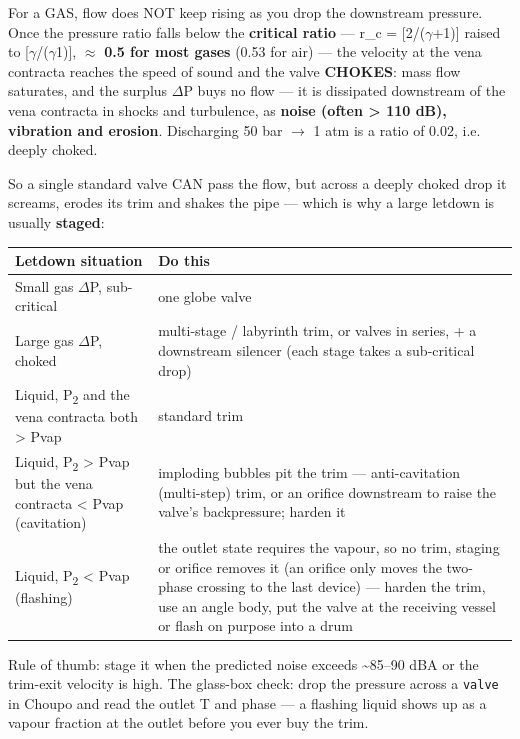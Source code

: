 \documentclass[11pt,a4paper]{article}
\begin{document}
For a GAS, flow does NOT keep rising as you drop the downstream
pressure. Once the pressure ratio falls below the \textbf{critical
ratio} --- r\_c = {[}2/(\(\gamma\)+1){]} raised to {[}\(\gamma\)/(\(\gamma\)\textminus{}1){]}, \(\approx\) \textbf{0.5
for most gases} (0.53 for air) --- the velocity at the vena contracta
reaches the speed of sound and the valve \textbf{CHOKES}: mass flow
saturates, and the surplus \(\Delta\)P buys no flow --- it is dissipated
downstream of the vena contracta in shocks and turbulence, as
\textbf{noise (often
\textgreater{} 110 dB), vibration and erosion}. Discharging 50 bar \(\rightarrow\) 1
atm is a ratio of 0.02, i.e. deeply choked.

So a single standard valve CAN pass the flow, but across a deeply choked
drop it screams, erodes its trim and shakes the pipe --- which is why a
large letdown is usually \textbf{staged}:

\begin{longtable}[]{@{}>{\raggedright\arraybackslash}p{\dimexpr(\linewidth-4\tabcolsep)/2\relax}>{\raggedright\arraybackslash}p{\dimexpr(\linewidth-4\tabcolsep)/2\relax}@{}}
\toprule\noalign{}
Letdown situation & Do this \\
\midrule\noalign{}
\endhead
\bottomrule\noalign{}
\endlastfoot
Small gas \(\Delta\)P, sub-critical & one globe valve \\
Large gas \(\Delta\)P, choked & multi-stage / labyrinth trim, or valves in
series, + a downstream silencer (each stage takes a sub-critical
drop) \\
Liquid, P\textsubscript{2} and the vena contracta both \textgreater{} Pvap & standard trim \\
Liquid, P\textsubscript{2} \textgreater{} Pvap but the vena contracta
\textless{} Pvap (cavitation) & imploding bubbles pit the trim --- anti-cavitation
(multi-step) trim, or an orifice downstream to raise the valve's
backpressure; harden it \\
Liquid, P\textsubscript{2} \textless{} Pvap (flashing) & the outlet state
requires the vapour, so no trim, staging or orifice removes it (an orifice
only moves the two-phase crossing to the last device) --- harden the trim,
use an angle body, put the valve at the receiving vessel or flash on
purpose into a drum \\
\end{longtable}

Rule of thumb: stage it when the predicted noise exceeds
\textasciitilde85--90 dBA or the trim-exit velocity is high. The
glass-box check: drop the pressure across a \texttt{valve} in Choupo and
read the outlet T and phase --- a flashing liquid shows up as a vapour
fraction at the outlet before you ever buy the trim.
\end{document}
